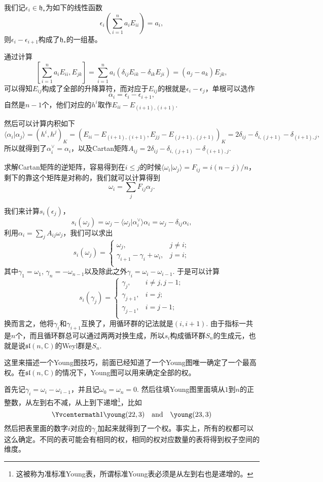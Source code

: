 \documentclass[9pt]{extarticle}
\newcommand{\cc}{\mathbb{C}}
\begin{document}
我们记$\epsilon_i \in \mathfrak{h}_*$为如下的线性函数
\[
	 \epsilon_i\left(\sum_{i=1}^n a_i E_{ii}\right)=a_i,
\]
则$\epsilon_i-\epsilon_{i+1}$构成了$\mathfrak{h}_*$的一组基。

通过计算
\[
	\left [\sum_{i=1}^n a_i E_{ii},E_{jk}\right ]=\sum_{i=1}^n  a_i(\delta_{ij}E_{ik}-\delta_{ik}E_{ji})=(a_j-a_k)E_{jk},
\]
可以得知$E_{ij}$构成了全部的升降算符，而对应于$E_{ij}$的根就是$\epsilon_i-\epsilon_j$，单根可以选作
\[
	\alpha_i = \epsilon_i-\epsilon_{i+1},
\]
自然是$n-1$个，他们对应的$h^i$取作$E_{i i}-E_{(i+1),(i+1)}$.

然后可以计算内积如下
\[
	\langle \alpha_i|\alpha_j\rangle = (h^i,h^j)_K=(E_{ii}-E_{(i+1),(i+1)},E_{jj}-E_{(j+1),(j+1)})_K=2\delta_{ij}-\delta_{i,(j+1)}-\delta_{(i+1),j},
\]
所以就得到了$\alpha^\vee_i=\alpha_i$，以及Cartan矩阵$A_{ij}=2\delta_{ij}-\delta_{i,(j+1)}-\delta_{(i+1),j}$. 

\para 求解Cartan矩阵的逆矩阵，容易得到在$i\leq j$的时候$\langle \omega_i|\omega_j\rangle=F_{ij}=i(n-j)/n$，剩下的靠这个矩阵是对称的，我们就可以计算得到
\[
	\omega_i=\sum_j F_{ij}\alpha_j.
\]

\para 我们来计算$s_i(\epsilon_j)$，
\[
	s_i(\omega_j)=\omega_j-\langle \omega_j|\alpha^\vee_i\rangle\alpha_i=\omega_j-\delta_{ij}\alpha_i,
\]
利用$\alpha_{i}=\sum_j A_{ij}\omega_j$，我们可以求出
\[
	s_i(\omega_j)=
	\begin{cases}
	\omega_j, & j\neq i;\\
	\gamma_{i+1}-\gamma_{i}+\omega_{i}, & j=i;\\
	\end{cases}
\]
其中$\gamma_{1}=\omega_1$, $\gamma_n=-\omega_{n-1}$以及除此之外$\gamma_i=\omega_{i}-\omega_{i-1}$. 于是可以计算
\[
	s_i(\gamma_{j})=
	\begin{cases}
	\gamma_{j}, & i\neq j,j-1;\\
	\gamma_{j+1}, & i=j;\\
	\gamma_{j-1}, & i=j-1;\\
	\end{cases}
\]
换而言之，他将$\gamma_i$和$\gamma_{i+1}$互换了，用循环群的记法就是$(i,i+1)$. 由于指标一共是$n$个，而且循环群总可以通过两两对换生成，所以$s_i$构成循环群$S_n$的生成元，也就是说$\mathfrak{sl}(n,\cc)$的Weyl群是$S_n$.

\para 这里来描述一个Young图技巧，前面已经知道了一个Young图唯一确定了一个最高权。在$\mathfrak{sl}(n,\cc)$的情况下，Young图可以用来确定全部的权。

首先记$\gamma_i=\omega_i-\omega_{i-1}$，并且记$\omega_0=\omega_n=0$. 然后往填Young图里面填从$1$到$n$的正整数，从左到右不减，从上到下递增\footnote{这被称为准标准Young表，所谓标准Young表必须是从左到右也是递增的。}，比如
\[
\Yvcentermath1
	\young(22,3)\quad \text{and}\quad \young(23,3)
\]
然后把表里面的数字$i$对应的$\gamma_i$加起来就得到了一个权。事实上，所有的权都可以这么确定。不同的表可能会有相同的权，相同的权对应数量的表将得到权子空间的维度。
\end{document}
